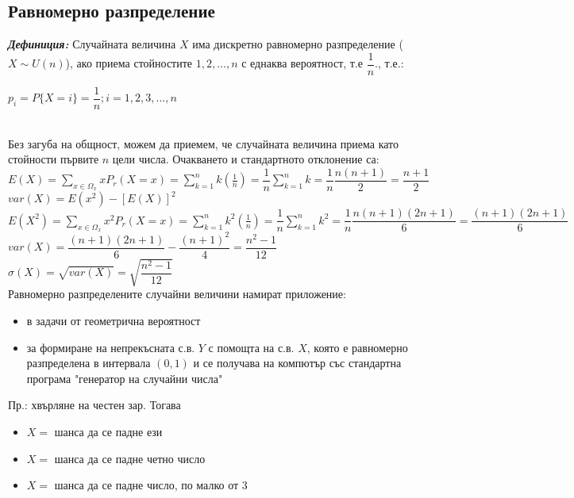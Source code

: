 \documentclass[11pt]{article} %
\newcommand{\italicBold}[1]{\textbf{\emph{#1}}}
\newcommand{\definition}{\italicBold{Дефиниция: }}
\newcommand{\curlies}[1]{\{#1\}}
\begin{document}
\subsection{Равномерно разпределение}
\definition Случайната величина $X$ има дискретно равномерно разпределение ($X \sim U(n)$), ако приема стойностите $1,2,...,n$ с еднаква вероятност, т.е $\dfrac{1}{n}$., т.е.:\\ \centerline{$p_{i}=P\curlies{X=i}=\dfrac{1}{n}; i=1,2,3,...,n$}\\Без загуба на общност, можем да приемем, че случайната величина приема като стойности първите $n$ цели числа. Очакването и стандартното отклонение са:\\
$E(X)=\displaystyle \sum_{x \in \Omega_x} x P_r(X=x)= \sum_{k=1}^n k(\frac{1}{n})=\dfrac{1}{n} \sum_{k=1}^n k=\dfrac{1}{n}\dfrac{n(n+1)}{2}=\dfrac{n+1}{2}$\\
$var(X)=E(x^{2})-[E(X)]^{2}$\\
$E(X^2)=\displaystyle \sum_{x \in \Omega_x} x^2 P_r(X=x)=\sum_{k=1}^n k^2 (\frac{1}{n})=\dfrac{1}{n} \sum_{k=1}^n k^2=\dfrac{1}{n}\dfrac{n(n+1)(2n+1)}{6}=\dfrac{(n+1)(2n+1)}{6}$\\
$var(X)=\dfrac{(n+1)(2n+1)}{6}-\dfrac{(n+1)^2}{4}=\dfrac{n^2 -1}{12}$\\
$\sigma(X)=\sqrt{var(X)}=\sqrt{\dfrac{n^2 -1}{12}}$\\
Равномерно разпределените случайни величини намират приложение: 
\begin{itemize}
	\item в задачи от геометрична вероятност\\
	\item за формиране на непрекъсната с.в. $Y$ с помощта на с.в. $X$, която е равномерно разпределена в интервала $(0,1)$ и се получава на компютър със стандартна програма "генератор на случайни числа"\\
\end{itemize}
Пр.: хвърляне на честен зар. Тогава
\begin{itemize}
	\item $X=$ шанса да се падне ези\\
	\item $X=$ шанса да се падне четно число\\
	\item $X=$ шанса да се падне число, по малко от 3\\
\end{itemize}
\end{document}
